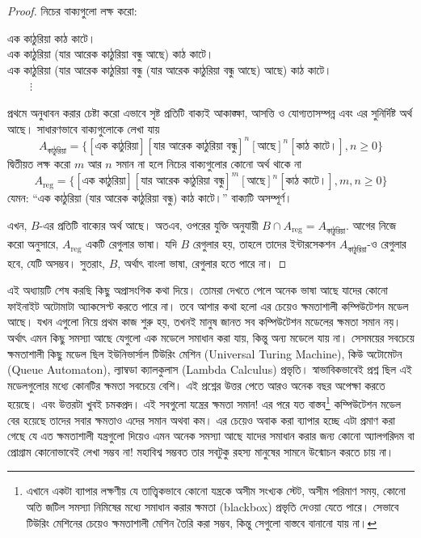 \begin{proof}
	নিচের বাক্যগুলো লক্ষ করো:
	\begin{center}
	\small এক কাঠুরিয়া কাঠ কাটে।\\
	এক কাঠুরিয়া (যার আরেক কাঠুরিয়া বন্ধু আছে) কাঠ কাটে।\\
	এক কাঠুরিয়া (যার আরেক কাঠুরিয়া বন্ধু (যার আরেক কাঠুরিয়া বন্ধু আছে) আছে) কাঠ কাটে।\normalsize\\
		$\qquad\vdots$
	\end{center}
	প্রথমে অনুধাবন করার চেষ্টা করো এভাবে সৃষ্ট প্রতিটি বাক্যই আকাঙ্ক্ষা, আসত্তি ও যোগ্যতাসম্পন্ন এবং এর সুনির্দিষ্ট অর্থ আছে। সাধারণভাবে বাক্যগুলোকে লেখা যায় 
	\[A_{\text{কাঠুরিয়া}}=\{[\text{এক কাঠুরিয়া}][\text{যার আরেক কাঠুরিয়া বন্ধু}]^n[\text{আছে}]^n[\text{কাঠ কাটে।}], n\ge 0\}\]
	দ্বিতীয়ত লক্ষ করো $m$ আর $n$ সমান না হলে নিচের বাক্যগুলোর কোনো অর্থ থাকে না
	\[A_{\text{reg}}=\{[\text{এক কাঠুরিয়া}][\text{যার আরেক কাঠুরিয়া বন্ধু}]^m[\text{আছে}]^n[\text{কাঠ কাটে।}], m, n\ge 0\}\]
	যেমন: ``এক কাঠুরিয়া (যার আরেক কাঠুরিয়া বন্ধু) কাঠ কাটে।'' বাক্যটি অসম্পূর্ণ।

	এখন, $B$-এর প্রতিটি বাক্যের অর্থ আছে। অতএব, ওপরের যুক্তি অনুযায়ী $B\cap A_{\text{reg}}=A_{\text{কাঠুরিয়া}}$. আগের নিজে করো অনুসারে, $A_{\text{reg}}$ একটি রেগুলার ভাষা। যদি $B$ রেগুলার হয়, তাহলে তাদের ইন্টারসেকশন $A_{\text{কাঠুরিয়া}}$-ও রেগুলার হবে, যেটি অসম্ভব। সুতরাং, $B$, অর্থাৎ বাংলা ভাষা, রেগুলার হতে পারে না। 
\end{proof}

এই অধ্যায়টি শেষ করছি কিছু অপ্রাসংগিক কথা দিয়ে। তোমরা দেখতে পেলে অনেক ভাষা আছে যাদের কোনো ফাইনাইট অটোমাটা অ্যাকসেপ্ট করতে পারে না। তবে আশার কথা হলো এর চেয়েও ক্ষমতাশালী কম্পিউটেশন মডেল আছে। যখন এগুলো নিয়ে প্রথম কাজ শুরু হয়, তখনই মানুষ জানত সব কম্পিউটেশন মডেলের ক্ষমতা সমান নয়। অর্থাৎ এমন কিছু সমস্যা আছে যেগুলো এক মডেলে সমাধান করা যায়, কিন্তু অন্য মডেলে যায় না। সেসময়ের সবচেয়ে ক্ষমতাশালী কিছু মডেল ছিল ইউনিভার্সাল টিউরিং মেশিন (Universal Turing Machine), কিউ অটোমেটন (Queue Automaton), ল্যাম্বডা ক্যালকুলাস (Lambda Calculus) প্রভৃতি। স্বাভাবিকভাবেই প্রশ্ন ছিল এই মডেলগুলোর মধ্যে কোনটির ক্ষমতা সবচেয়ে বেশি। এই প্রশ্নের উত্তর পেতে আরও অনেক বছর অপেক্ষা করতে হয়েছে। এবং উত্তরটা খুবই চমকপ্রদ। এই সবগুলো যন্ত্রের ক্ষমতা সমান! এর পরে যত বাস্তব\footnote{এখানে একটা ব্যাপার লক্ষণীয় যে তাত্ত্বিকভাবে কোনো যন্ত্রকে অসীম সংখ্যক স্টেট, অসীম পরিমাণ সময়, কোনো অতি জটিল সমস্যা নিমিষের মধ্যে সমাধান করার ক্ষমতা (blackbox) প্রভৃতি দেওয়া যেতে পারে। সেভাবে টিউরিং মেশিনের চেয়েও ক্ষমতাশালী মেশিন তৈরি করা সম্ভব, কিন্তু সেগুলো বাস্তবে বানানো যায় না।} কম্পিউটেশন মডেল বের হয়েছে তাদের সবার ক্ষমতাও এদের সমান অথবা কম। এর চেয়েও অবাক করা ব্যাপার হচ্ছে এটা প্রমাণ করা গেছে যে এত ক্ষমতাশালী যন্ত্রগুলো দিয়েও এমন অনেক সমস্যা আছে যাদের সমাধান করার জন্য কোনো অ্যালগরিদম বা প্রোগ্রাম কোনোভাবেই লেখা সম্ভব না! মহাবিশ্ব সম্ভবত তার সবটুকু রহস্য মানুষের সামনে উন্মোচন করতে চায় না।

